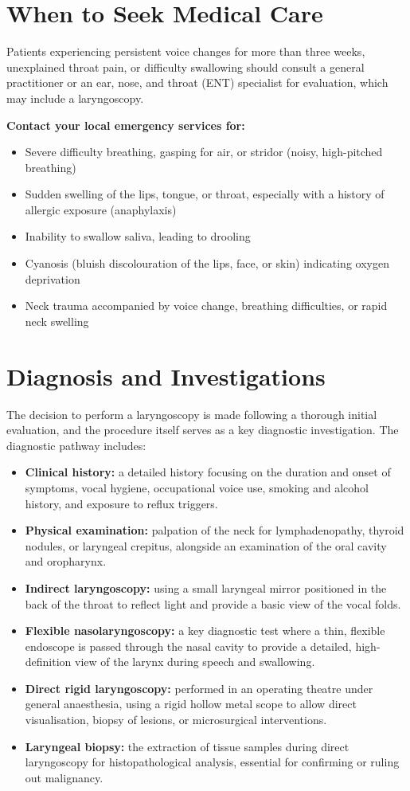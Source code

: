 \section*{When to Seek Medical Care}
Patients experiencing persistent voice changes for more than three weeks, unexplained throat pain, or difficulty swallowing should consult a general practitioner or an ear, nose, and throat (ENT) specialist for evaluation, which may include a laryngoscopy.

\textbf{Contact your local emergency services for:}
\begin{itemize}
    \item Severe difficulty breathing, gasping for air, or stridor (noisy, high-pitched breathing)
    \item Sudden swelling of the lips, tongue, or throat, especially with a history of allergic exposure (anaphylaxis)
    \item Inability to swallow saliva, leading to drooling
    \item Cyanosis (bluish discolouration of the lips, face, or skin) indicating oxygen deprivation
    \item Neck trauma accompanied by voice change, breathing difficulties, or rapid neck swelling
\end{itemize}

\section*{Diagnosis and Investigations}
The decision to perform a laryngoscopy is made following a thorough initial evaluation, and the procedure itself serves as a key diagnostic investigation. The diagnostic pathway includes:
\begin{itemize}
    \item \textbf{Clinical history:} a detailed history focusing on the duration and onset of symptoms, vocal hygiene, occupational voice use, smoking and alcohol history, and exposure to reflux triggers.
    \item \textbf{Physical examination:} palpation of the neck for lymphadenopathy, thyroid nodules, or laryngeal crepitus, alongside an examination of the oral cavity and oropharynx.
    \item \textbf{Indirect laryngoscopy:} using a small laryngeal mirror positioned in the back of the throat to reflect light and provide a basic view of the vocal folds.
    \item \textbf{Flexible nasolaryngoscopy:} a key diagnostic test where a thin, flexible endoscope is passed through the nasal cavity to provide a detailed, high-definition view of the larynx during speech and swallowing.
    \item \textbf{Direct rigid laryngoscopy:} performed in an operating theatre under general anaesthesia, using a rigid hollow metal scope to allow direct visualisation, biopsy of lesions, or microsurgical interventions.
    \item \textbf{Laryngeal biopsy:} the extraction of tissue samples during direct laryngoscopy for histopathological analysis, essential for confirming or ruling out malignancy.
\end{itemize}

